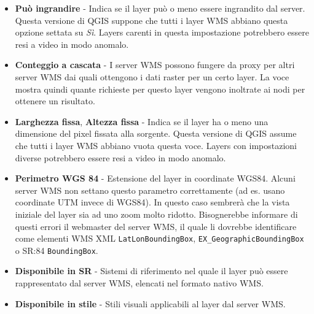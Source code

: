 \begin{itemize}[label=--]
\begin{itemize}[label=--]
\item \textbf{Può ingrandire}      - Indica se il layer può o meno
                                     essere ingrandito dal server.
				     Questa versione di QGIS suppone che tutti i
                                     layer WMS abbiano questa opzione settata su \textsl{Sì}.
                                     Layers carenti in questa impostazione
				     potrebbero essere resi a video in modo
				     anomalo.

\item \textbf{Conteggio a cascata}    - I server WMS possono fungere da proxy
                                        per altri server WMS dai quali ottengono
					i dati raster per un certo layer. La
                                        voce mostra quindi quante richieste per questo
					layer vengono inoltrate ai nodi
                                        per ottenere un risultato.

\item \textbf{Larghezza fissa}, \textbf{Altezza fissa}
                                - Indica se il layer ha o meno una
				dimensione del pixel fissata alla sorgente.
                                  Questa versione di QGIS assume che tutti i
				  layer WMS abbiano vuota questa voce. Layers
				  con impostazioni diverse potrebbero essere resi
				  a video in modo anomalo.

\item \textbf{Perimetro WGS 84} - Estensione del layer in coordinate WGS84. Alcuni server
                                   WMS non settano questo parametro correttamente (ad
				   es. usano coordinate UTM invece di WGS84).
				   In questo caso sembrerà che la vista
				   iniziale del layer
                                   sia ad uno zoom molto ridotto. Bisognerebbe
				   informare di questi errori il webmaster del
				   server WMS, il quale li dovrebbe
				   identificare come elementi
				   WMS XML \texttt{LatLonBoundingBox},
				   \texttt{EX\_GeographicBoundingBox} o SR:84 \texttt{BoundingBox}.

\item \textbf{Disponibile in SR} - Sistemi di riferimento nel quale il layer
                                    può essere rappresentato dal server WMS,
				    elencati nel formato nativo WMS.

\item \textbf{Disponibile in stile} - Stili visuali applicabili al layer dal server WMS.

\end{itemize}

\end{itemize}


